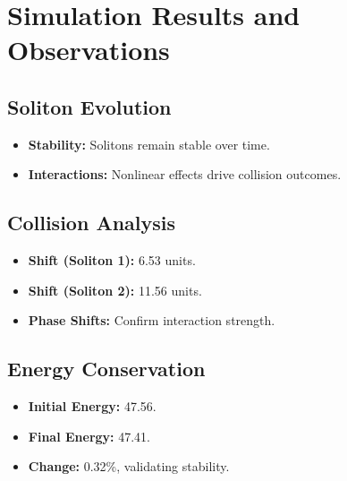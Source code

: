 \documentclass{article}
\begin{document}
\section{Simulation Results and Observations}
\subsection{Soliton Evolution}
\begin{itemize}
    \item \textbf{Stability:} Solitons remain stable over time.
    \item \textbf{Interactions:} Nonlinear effects drive collision outcomes.
\end{itemize}

\subsection{Collision Analysis}
\begin{itemize}
    \item \textbf{Shift (Soliton 1):} 6.53 units.
    \item \textbf{Shift (Soliton 2):} 11.56 units.
    \item \textbf{Phase Shifts:} Confirm interaction strength.
\end{itemize}

\subsection{Energy Conservation}
\begin{itemize}
    \item \textbf{Initial Energy:} 47.56.
    \item \textbf{Final Energy:} 47.41.
    \item \textbf{Change:} 0.32\%, validating stability.
\end{itemize}
\end{document}
